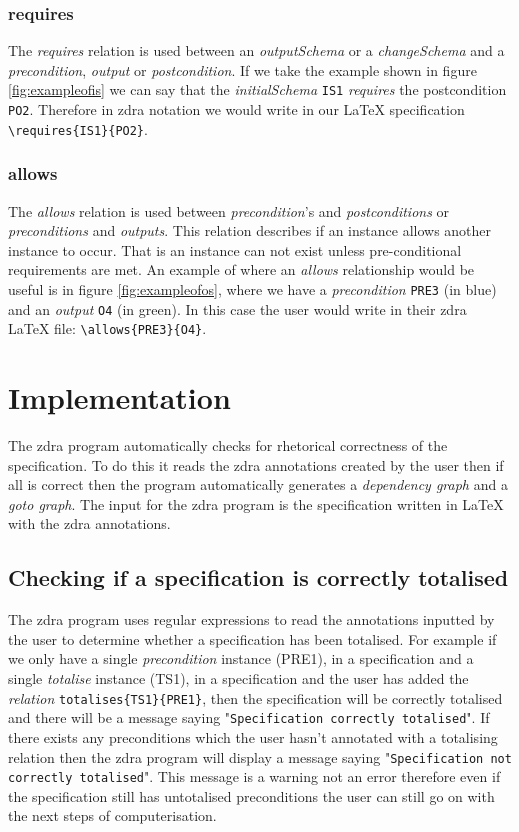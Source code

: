 \subsubsection{requires}
The \emph{requires} relation is used between an \emph{outputSchema} or a \emph{changeSchema} and a \emph{precondition}, \emph{output} or \emph{postcondition}. If we take the example shown in figure \ref{fig:exampleofis} we can say that the \emph{initialSchema} \verb|IS1| \emph{requires} the postcondition \verb|PO2|. Therefore in \gls{zdra} notation we would write in our \LaTeX{} specification \verb|\requires{IS1}{PO2}|.

\subsubsection{allows}
The \emph{allows} relation is used between \emph{precondition}'s and \emph{postconditions} or \emph{preconditions} and \emph{outputs}. This relation describes if an instance allows another instance to occur. That is an instance can not exist unless pre-conditional requirements are met. An example of where an \emph{allows} relationship would be useful is in figure \ref{fig:exampleofos}, where we have a \emph{precondition} \verb|PRE3| (in blue) and an \emph{output} \verb|O4| (in green). In this case the user would write in their \gls{zdra} \LaTeX{} file: \verb|\allows{PRE3}{O4}|.


\section{Implementation}
\label{sec:zdra_implement}

The \gls{zdra} program automatically checks for rhetorical correctness of the specification. To do this it reads the \gls{zdra} annotations created by the user then if all is correct then the program automatically generates a \emph{dependency graph} and a \emph{goto graph}. The input for the \gls{zdra} program is the specification written in \LaTeX{} with the \gls{zdra} annotations.

\subsection{Checking if a specification is correctly totalised}

The \gls{zdra} program uses regular expressions to read the annotations inputted by the user to determine whether a specification has been totalised. For example if we only have a single \emph{precondition} instance (PRE1), in a specification and a single \emph{totalise} instance (TS1), in a specification and the user has added the \emph{relation} \verb|totalises{TS1}{PRE1}|, then the specification will be correctly totalised and there will be a message saying "\texttt{Specification correctly totalised}". If there exists any preconditions which the user hasn't annotated with a totalising relation then the \gls{zdra} program will display a message saying "\texttt{Specification not correctly totalised}". This message is a warning not an error therefore even if the specification still has untotalised preconditions the user can still go on with the next steps of computerisation.

